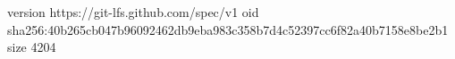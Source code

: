 version https://git-lfs.github.com/spec/v1
oid sha256:40b265cb047b96092462db9eba983c358b7d4c52397cc6f82a40b7158e8be2b1
size 4204
